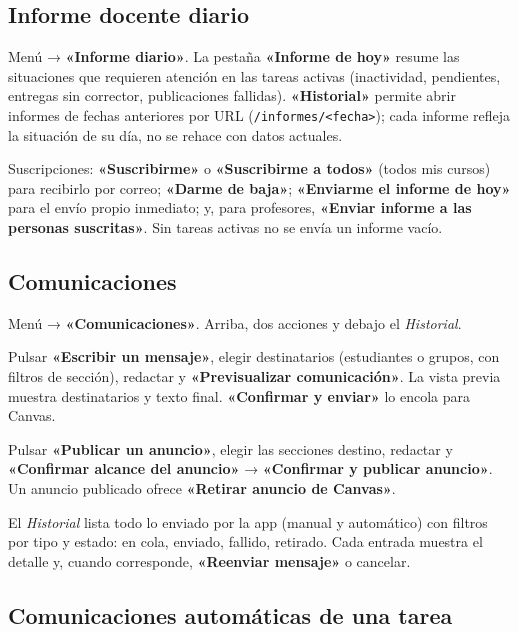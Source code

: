 \documentclass[11pt,a4paper]{article}
\newcommand{\ui}[1]{\textbf{«#1»}}        %
\newcommand{\ruta}[1]{\texttt{#1}}        %
\begin{document}
\subsection{Informe docente diario}

Menú → \ui{Informe diario}. La pestaña \ui{Informe de hoy} resume las situaciones que requieren atención en las tareas activas (inactividad, pendientes, entregas sin corrector, publicaciones fallidas). \ui{Historial} permite abrir informes de fechas anteriores por URL (\ruta{/informes/<fecha>}); cada informe refleja la situación de su día, no se rehace con datos actuales.

Suscripciones: \ui{Suscribirme} o \ui{Suscribirme a todos} (todos mis cursos) para recibirlo por correo; \ui{Darme de baja}; \ui{Enviarme el informe de hoy} para el envío propio inmediato; y, para profesores, \ui{Enviar informe a las personas suscritas}. Sin tareas activas no se envía un informe vacío.

\subsection{Comunicaciones}

Menú → \ui{Comunicaciones}. Arriba, dos acciones y debajo el \emph{Historial}.

\begin{description}[style=nextline,leftmargin=0.6cm]
  \item[Mensaje dirigido] Pulsar \ui{Escribir un mensaje}, elegir destinatarios (estudiantes o grupos, con filtros de sección), redactar y \ui{Previsualizar comunicación}. La vista previa muestra destinatarios y texto final. \ui{Confirmar y enviar} lo encola para Canvas.
  \item[Anuncio] Pulsar \ui{Publicar un anuncio}, elegir las secciones destino, redactar y \ui{Confirmar alcance del anuncio} → \ui{Confirmar y publicar anuncio}. Un anuncio publicado ofrece \ui{Retirar anuncio de Canvas}.
\end{description}

El \emph{Historial} lista todo lo enviado por la app (manual y automático) con filtros por tipo y estado: en cola, enviado, fallido, retirado. Cada entrada muestra el detalle y, cuando corresponde, \ui{Reenviar mensaje} o cancelar.

\subsection{Comunicaciones automáticas de una tarea}
\end{document}
